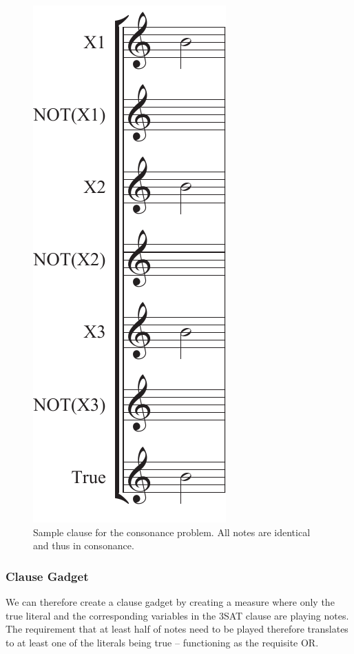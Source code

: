 \documentclass[11pt,letterpaper]{article}
\begin{document}
\begin{figure}
  \centering
  \vspace*{-7mm}
  \includegraphics[width=0.65\linewidth]{clause.pdf}
  \caption{Sample clause for the consonance problem. All notes are identical and thus in consonance.}
\end{figure}

\subsubsection{Clause Gadget}
We can therefore create a clause gadget by creating a measure where only the true literal and the corresponding variables in the 3SAT clause are playing notes. The requirement that at least half of notes need to be played therefore translates to at least one of the literals being true -- functioning as the requisite OR.
\end{document}

